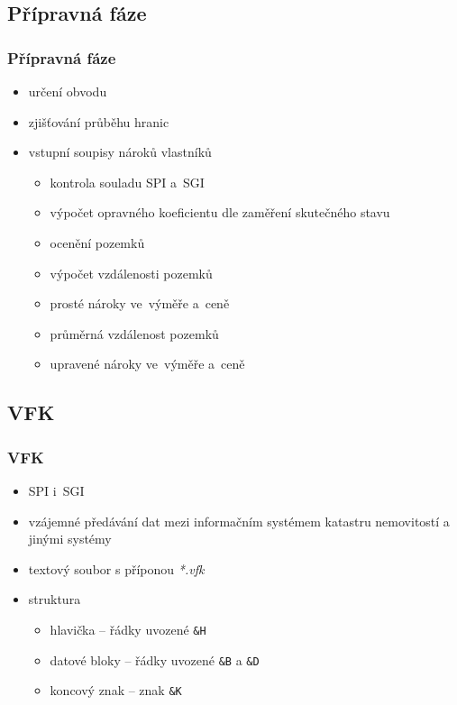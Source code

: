 \documentclass{beamer}
\begin{document}

\subsection{Přípravná fáze}

\begin{frame}

\frametitle{Přípravná fáze}

\begin{itemize}
	\item určení obvodu
	\item zjišťování průběhu hranic
	\item vstupní soupisy nároků vlastníků
	\begin{itemize}
		\item kontrola souladu SPI a~SGI
		\item výpočet opravného koeficientu dle zaměření skutečného stavu
		\item ocenění pozemků
		\item výpočet vzdálenosti pozemků
		\item prosté nároky ve~výměře a~ceně
		\item průměrná vzdálenost pozemků
		\item upravené nároky ve~výměře a~ceně
	\end{itemize}
\end{itemize}

\end{frame}


\subsection{VFK}

\begin{frame}

\frametitle{VFK}

\begin{itemize}
	\item SPI i~SGI
	\item vzájemné předávání dat mezi informačním systémem katastru nemovitostí a jinými systémy
	\item textový soubor s příponou \textit{*.vfk}
	\item struktura
	\begin{itemize}
		\item hlavička – řádky uvozené \texttt{\&H}
		\item datové bloky – řádky uvozené \texttt{\&B} a \texttt{\&D}
		\item koncový znak – znak \texttt{\&K}
	\end{itemize}
\end{itemize}

\end{frame}
\end{document}
